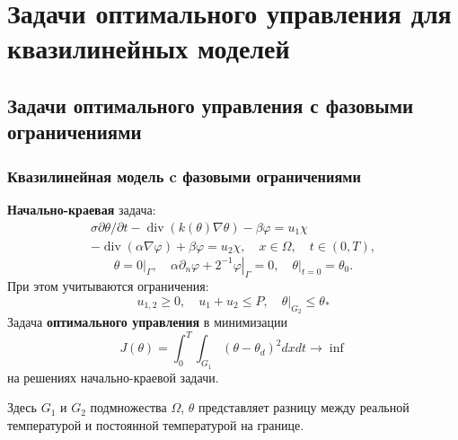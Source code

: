 \section{Задачи оптимального управления для квазилинейных моделей}\label{sec:opt}

\subsection{Задачи оптимального управления с фазовыми ограничениями}
\begin{frame}
    \frametitle{Квазилинейная модель c фазовыми ограничениями}
    \textbf{Начально-краевая} задача:
    \begin{equation}
        \label{eq:3_2:1}
        \begin{gathered}
            \sigma \partial \theta / \partial t-\operatorname{div}(k(\theta)
            \nabla \theta)-\beta \varphi=u_{1} \chi \\
            -\operatorname{div}(\alpha \nabla \varphi)+\beta \varphi=u_{2}
            \chi, \quad x \in \Omega, \quad t \in(0, T),
        \end{gathered}
    \end{equation}
    \begin{equation}
        \label{eq:3_2:2}
        \theta=\left.0\right|_{\Gamma},
        \quad \alpha \partial_{n} \varphi
        +\left.2^{-1} \varphi\right|_{\Gamma}=0,
        \left.\quad \theta\right|_{t=0}=\theta_{0}.
    \end{equation}
    При этом учитываются ограничения:
    \[ u_{1,2} \geq 0, \quad u_{1}+u_{2} \leq P, \left.\quad \theta\right|_{G_{2}} \leq \theta_{*} \]
    Задача \textbf{оптимального управления} в минимизации
    \[ J(\theta)=\int_{0}^{T} \int_{G_{1}}\left(\theta-\theta_{d}\right)^{2} dx dt \rightarrow \inf \]
    на решениях начально-краевой задачи.

    Здесь $G_{1}$ и $G_{2}$ подмножества $\Omega$, $\theta$
    представляет разницу между реальной температурой
    и постоянной температурой на границе.
\end{frame}

